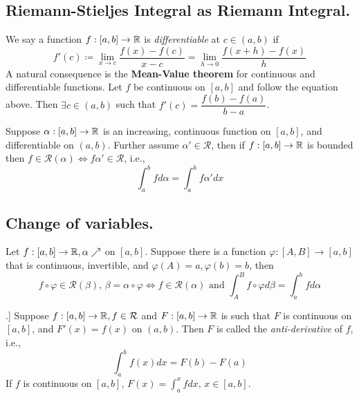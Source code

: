\subsection{Riemann-Stieljes Integral as Riemann Integral.}

We say a function $f:[a,b]\to \mathbb{R}$ is \textit{differentiable} at $c\in(a,b)$ if
\begin{equation*}
f'(c)\coloneqq \lim_{x\to c}\frac{f(x)-f(c)}{x-c} = \lim_{h\to 0}\frac{f(x+h)-f(x)}{h}
\end{equation*}
A natural consequence is the \textbf{Mean-Value theorem} for continuous and differentiable functions.
Let $f$ be continuous on $[a,b]$ and follow the equation above.
Then $\exists c\in (a,b)$ such that $f'(c)=\dfrac{f(b)-f(a)}{b-a}$.

\begin{theorem}
Suppose $\alpha:[a,b]\to\mathbb{R}$ is an increasing, continuous function on $[a,b]$, and differentiable on $(a,b)$.
Further assume $\alpha'\in\mathcal{R}$, then if $f:[a,b]\to\mathbb{R}$ is bounded then $f\in\mathcal{R}(\alpha)\iff f\alpha'\in\mathcal R$, i.e.,
\begin{equation*}
\int^b_afd\alpha = \int^b_a f\alpha' dx
\end{equation*}
\end{theorem}

\subsection{Change of variables.}
Let $f:[a,b]\to\mathbb{R},\alpha\nearrow$ on $[a,b]$.
Suppose there is a function $\varphi:[A,B]\to [a,b]$ that is continuous, invertible, and $\varphi(A)=a,\varphi(b)=b$, then \begin{equation*}
f\circ\varphi\in\mathcal{R}(\beta),\,\beta=\alpha\circ\varphi\iff f\in\mathcal{R}(\alpha)\text{ and }\int^B_Af\circ\varphi d\beta=\int^b_afd\alpha
\end{equation*}

\begin{theorem}[Fundamental Theorem of Calculus [FTC].]
Suppose $f:[a,b]\to\mathbb{R},f\in\mathcal{R}$ and $F:[a,b]\to\mathbb{R}$ is such that $F$ is continuous on $[a,b]$, and $F'(x)=f(x)$ on $(a,b)$.
Then $F$ is called the \emph{anti-derivative} of $f$, i.e., 
\begin{equation*}
    \int^b_af(x)dx=F(b)-F(a)
\end{equation*}
If $f$ is continuous on $[a,b]$, $F(x)=\int^x_afdx,\,x\in[a,b]$.
\end{theorem}

